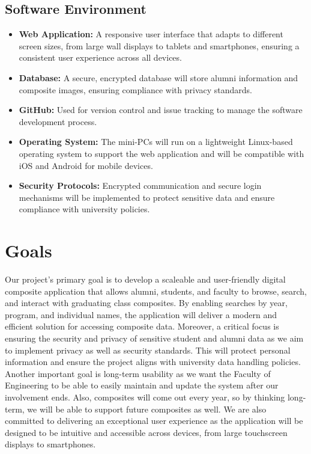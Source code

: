 \documentclass{article}
\begin{document}
\subsection*{Software Environment}
\begin{itemize}
    \item \textbf{Web Application:}  
    A responsive user interface that adapts to different screen sizes, from large wall displays to tablets and smartphones, ensuring a consistent user experience across all devices.

    \item \textbf{Database:}  
    A secure, encrypted database will store alumni information and composite images, ensuring compliance with privacy standards.

    \item \textbf{GitHub:}  
    Used for version control and issue tracking to manage the software development process.

    \item \textbf{Operating System:}  
    The mini-PCs will run on a lightweight Linux-based operating system to support the web application and will be compatible with iOS and Android for mobile devices.

    \item \textbf{Security Protocols:}  
    Encrypted communication and secure login mechanisms will be implemented to protect sensitive data and ensure compliance with university policies.
\end{itemize}

\section{Goals}

 Our project’s primary goal is to develop a scaleable and user-friendly digital composite application that allows alumni, students, and faculty to browse, search, and interact with graduating class composites. By enabling searches by year, program, and individual names, the application will deliver a modern and efficient solution for accessing composite data.
\newline
\newline
Moreover, a critical focus is ensuring the security and privacy of sensitive student and alumni data as we aim to implement privacy as well as security standards. This will protect personal information and ensure the project aligns with university data handling policies.
\newline
\newline
Another important goal is long-term usability as we want the Faculty of Engineering to be able to easily maintain and update the system after our involvement ends. Also, composites will come out every year, so by thinking long-term, we will be able to support future composites as well.
\newline	
\newline
We are also committed to delivering an exceptional user experience as the application will be designed to be intuitive and accessible across devices, from large touchscreen displays to smartphones. 
\end{document}
